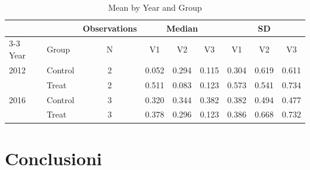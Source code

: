 \documentclass[lualatex,12pt,a4paper]{article}
\begin{document}
\begin{table}[ht]
\centering
\begin{tabular}{@{\extracolsep{4pt}}llccccccc}
\toprule   
{} & {} & {Observations} & \multicolumn{3}{c}{Median}  & \multicolumn{3}{c}{SD}\\
 \cmidrule{3-3} 
 \cmidrule{4-6} 
 \cmidrule{7-9} 
 Year & Group & N & V1 & V2 & V3 & V1 & V2 & V3 \\ 
\midrule
2012  & Control & 2 & 0.052 & 0.294 & 0.115 & 0.304 & 0.619 & 0.611 \\ 
  & Treat & 2 & 0.511 & 0.083 & 0.123 & 0.573 & 0.541 & 0.734 \\ 
2016  & Control & 3 & 0.320 & 0.344 & 0.382 & 0.382 & 0.494 & 0.477 \\ 
  & Treat & 3 & 0.378 & 0.296 & 0.123 & 0.386 & 0.668 & 0.732 \\ 
\bottomrule
\end{tabular}
\caption{Mean by Year and Group \cite{big}} 
\end{table}

 \section{Conclusioni}
 \lipsum[11-15]

\pagebreak


\end{document}
